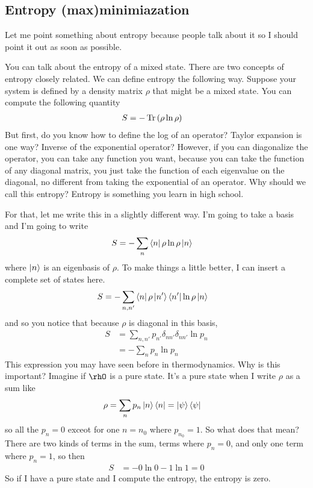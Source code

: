 \subsection{Entropy (max)minimiazation}
Let me point something about entropy because people talk about it so I should
point it out as soon as possible.

You can talk about the entropy of a mixed state.
There are two concepts of entropy closely related.
We can define entropy the following way.
Suppose your system is defined by a density matrix $\rho$
that might be a mixed state.
You can compute the following quantity
\begin{align}
    S &= - \Tr \left( \rho \ln \rho \right)
\end{align}
But first,
do you know how to define the log of an operator?
Taylor expansion is one way?
Inverse of the exponential operator?
However,
if you can diagonalize the operator,
you can take any function you want,
because you can take the function of any diagonal matrix,
you just take the function of each eigenvalue on the diagonal,
no different from taking the exponential of an operator.
Why should we call this entropy?
Entropy is something you learn in high school.

For that,
let me write this in a slightly different way.
I'm going to take a basis and I'm going to write
\begin{align}
    S &=
    - \sum_n
    \bra{n} \rho \ln\rho \ket{n}
\end{align}
where $\ket{n}$ is an eigenbasis of $\rho$.
To make things a little better,
I can insert a complete set of states here.
\begin{align}
    S &=
    - \sum_{n,n'}
    \bra{n} \rho \ket{n'}\bra{n'}\ln\rho \ket{n}
\end{align}
and so you notice that because $\rho$ is diagonal in this basis,
\begin{align}
    S &= \sum_{n,n'} p_{n'}\delta_{nn'} \delta_{nn'}\ln p_n\\
    &= - \sum_n p_n \ln p_n
\end{align}
This expression you may have seen before in thermodynamics.
Why is this important?
Imagine if $\rhO$ is a pure state.
It's a pure state when I write $\rho$ as a sum like
\begin{align}
    \rho &= \sum_n p_n \ket{n}\bra{n} = \ket{\psi}\bra{\psi}
\end{align}
so all the $p_n=0$ exceot for one $n=n_0$ where $p_{n_0}=1$.
So what does that mean?
There are two kinds of terms in the sum,
terms where $p_n=0$,
and only one term where $p_n=1$,
so then
\begin{align}
    S &= - 0 \ln 0 - 1\ln 1 = 0
\end{align}
So if I have a pure state
and I compute the entropy,
the entropy is zero.

